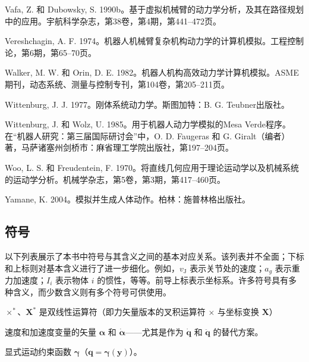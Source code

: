 \documentclass[10pt,a4paper]{book}
\theoremstyle{thmstyle} %
\theoremstyle{defstyle} %
\theoremstyle{prostyle} %
\begin{document}
Vafa, Z. 和 Dubowsky, S. 1990b。基于虚拟机械臂的动力学分析，及其在路径规划中的应用。宇航科学杂志，第38卷，第4期，第441–472页。



Vereshchagin, A. F. 1974。机器人机械臂复杂机构动力学的计算机模拟。工程控制论，第6期，第65–70页。



Walker, M. W. 和 Orin, D. E. 1982。机器人机构高效动力学计算机模拟。ASME期刊，动态系统、测量与控制专刊，第104卷，第205–211页。



Wittenburg, J. J. 1977。刚体系统动力学。斯图加特：B. G. Teubner出版社。



Wittenburg, J. 和 Wolz, U. 1985。用于机器人动力学模拟的Mesa Verde程序。在“机器人研究：第三届国际研讨会”中，O. D. Faugeras 和 G. Giralt（编者）著，马萨诸塞州剑桥市：麻省理工学院出版社，第197–204页。



Woo, L. S. 和 Freudentein, F. 1970。将直线几何应用于理论运动学以及机械系统的运动学分析。机械学杂志，第5卷，第3期，第417–460页。



Yamane, K. 2004。模拟并生成人体动作。柏林：施普林格出版社。



\subsection{符号}





以下列表展示了本书中符号与其含义之间的基本对应关系。该列表并不全面；下标和上标则对基本含义进行了进一步细化。例如，$v_{\mathrm{J}}$ 表示关节处的速度；$a_{g}$ 表示重力加速度；$I_{i}$ 表示物体 $i$ 的惯性，等等。前导上标表示坐标系。许多符号具有多种含义，而少数含义则有多个符号可供使用。



$\times^{*}$、$\boldsymbol{X}^{*}$ 是双线性运算符（即力矢量版本的叉积运算符 $\times$ 与坐标变换 $\boldsymbol{X}$）



速度和加速度变量的矢量 $\boldsymbol{\alpha}$ 和 $\dot{\boldsymbol{\alpha}}$——尤其是作为 $\dot{\boldsymbol{q}}$ 和 $\ddot{\boldsymbol{q}}$ 的替代方案。



显式运动约束函数 $\boldsymbol{\gamma}$（$\boldsymbol{q}=\boldsymbol{\gamma}(\boldsymbol{y})$）。
\end{document}
